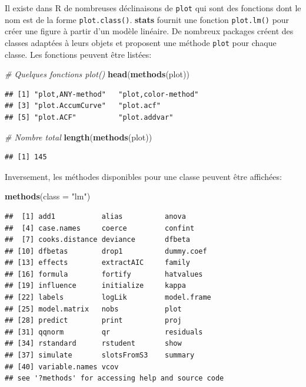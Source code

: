 \documentclass[
  12pt,
  french,
  a4paper,
  extrafontsizes,onecolumn,openright
  ]{memoir}
\newenvironment{Shaded}{\begin{snugshade}}{\end{snugshade}}
\newcommand{\CommentTok}[1]{\textcolor[rgb]{0.56,0.35,0.01}{\textit{#1}}}
\newcommand{\DataTypeTok}[1]{\textcolor[rgb]{0.13,0.29,0.53}{#1}}
\newcommand{\KeywordTok}[1]{\textcolor[rgb]{0.13,0.29,0.53}{\textbf{#1}}}
\newcommand{\NormalTok}[1]{#1}
\newcommand{\StringTok}[1]{\textcolor[rgb]{0.31,0.60,0.02}{#1}}
\begin{document}
\normalsize

Il existe dans R de nombreuses déclinaisons de \texttt{plot} qui sont des fonctions dont le nom est de la forme \texttt{plot.class()}.
\textbf{stats} fournit une fonction \texttt{plot.lm()} pour créer une figure à partir d'un modèle linéaire.
De nombreux packages créent des classes adaptées à leurs objets et proposent une méthode \texttt{plot} pour chaque classe.
Les fonctions peuvent être listées:

\scriptsize

\begin{Shaded}
\begin{Highlighting}[]
\CommentTok{# Quelques fonctions plot()}
\KeywordTok{head}\NormalTok{(}\KeywordTok{methods}\NormalTok{(plot))}
\end{Highlighting}
\end{Shaded}

\begin{verbatim}
## [1] "plot,ANY-method"   "plot,color-method"
## [3] "plot.AccumCurve"   "plot.acf"         
## [5] "plot.ACF"          "plot.addvar"
\end{verbatim}

\begin{Shaded}
\begin{Highlighting}[]
\CommentTok{# Nombre total}
\KeywordTok{length}\NormalTok{(}\KeywordTok{methods}\NormalTok{(plot))}
\end{Highlighting}
\end{Shaded}

\begin{verbatim}
## [1] 145
\end{verbatim}

\normalsize
Inversement, les méthodes disponibles pour une classe peuvent être affichées:

\scriptsize

\begin{Shaded}
\begin{Highlighting}[]
\KeywordTok{methods}\NormalTok{(}\DataTypeTok{class =} \StringTok{"lm"}\NormalTok{)}
\end{Highlighting}
\end{Shaded}

\begin{verbatim}
##  [1] add1           alias          anova         
##  [4] case.names     coerce         confint       
##  [7] cooks.distance deviance       dfbeta        
## [10] dfbetas        drop1          dummy.coef    
## [13] effects        extractAIC     family        
## [16] formula        fortify        hatvalues     
## [19] influence      initialize     kappa         
## [22] labels         logLik         model.frame   
## [25] model.matrix   nobs           plot          
## [28] predict        print          proj          
## [31] qqnorm         qr             residuals     
## [34] rstandard      rstudent       show          
## [37] simulate       slotsFromS3    summary       
## [40] variable.names vcov          
## see '?methods' for accessing help and source code
\end{verbatim}
\end{document}
